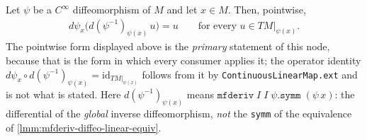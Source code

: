 \begin{lemma}
    \label{lmm:mfderiv-symm-cancel-left}
    \leanok
    Let $\psi$ be a $C^\infty$ diffeomorphism of $M$ and let $x \in M$. Then, pointwise,
    \begin{align}
        d\psi_x\big(d(\psi^{-1})_{\psi(x)}\,u\big) = u \qquad \text{for every } u \in TM|_{\psi(x)}.
    \end{align}
    The pointwise form displayed above is the \emph{primary} statement of this node, because that is the form in which every consumer applies it; the operator identity $d\psi_x \circ d(\psi^{-1})_{\psi(x)} = \mathrm{id}_{TM|_{\psi(x)}}$ follows from it by \texttt{ContinuousLinearMap.ext} and is not what is stated. Here $d(\psi^{-1})_{\psi(x)}$ means $\mathtt{mfderiv}\;I\;I\;\psi.\mathtt{symm}\;(\psi\,x)$: the differential of the \emph{global} inverse diffeomorphism, \emph{not} the \texttt{symm} of the equivalence of \ref{lmm:mfderiv-diffeo-linear-equiv}.
\end{lemma}
